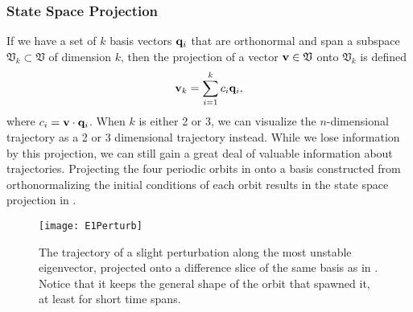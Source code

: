 \subsubsection{State Space Projection}
If we have a set of $k$ basis vectors $\mathbf{q}_i$ that are orthonormal and span a subspace $\mathfrak{V}_k \subset \mathfrak{V}$ of dimension $k$, then the projection of a vector $\mathbf{v} \in \mathfrak{V}$ onto $\mathfrak{V}_k$ is defined 
\begin{equation}
\Vector{v}_k = \sum{i = 1}{k}{c_i \Vector{q}_i},
\end{equation}
where $c_i = \mathbf{v} \cdot \mathbf{q}_i$. When $k$ is either 2 or 3, we can visualize the $n$-dimensional trajectory as a 2 or 3 dimensional trajectory instead. While we lose information by this projection, we can still gain a great deal of valuable information about trajectories. Projecting the four periodic orbits in  onto a basis constructed from orthonormalizing the initial conditions of each orbit results in the state space projection in .\\
\begin{figure}[h!]
\centerline{\texttt{[image: E1Perturb]}}
\caption{The trajectory of a slight perturbation along the most unstable eigenvector, projected onto a difference slice of the same basis as in . Notice that it keeps the general shape of the orbit that spawned it, at least for short time spans.}\label{fig:p8E1}
\end{figure}

